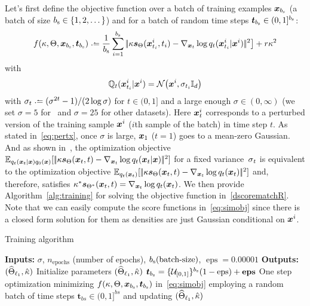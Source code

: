 Let's first define the objective function over a batch  of training examples $\x_{\batchS}$ (a batch of size $\batchS\in \{1,2,\dots\}$) and for a batch of random time steps $\boldsymbol{t}_{\batchS}\in (0,1]^{\batchS}$: 
\begin{equation}\label{eq:simobj}
f(\scale,\Theta,\x_{\batchS},\boldsymbol{t}_{\batchS})\deq \frac{1}{\batchS}\sum_{i=1}^{\batchS}\norm{\scale\scoref(\x^i_{t_i},t_i)-\nabla_{\x_{t}}\log \Fdd_t(\x^i_{t_i}|\x^i)}^2\bigr]
 +\tuning \scale^2 
\end{equation}
with 
\begin{equation}\label{eq:pertx}   \Fd_t(\x^i_{t_i}|\x^i)=\mathcal{N}\bigl(\x^i,\sigma_{t_i}\Identity\bigr) 
\end{equation}
with $\sigma_t\deq (\sigma^{2t}-1)/(2\log \sigma)$ for $t\in (0,1]$ and a large enough $\sigma\in (0,\infty)$ (we set $\sigma=5$ for \ButF~and $\sigma=25$ for other datasets). 
Here $\x^i_t$ corresponds to a perturbed version of the training sample $\x^i$ ($i$th sample of the batch) in  time step $t$. As stated in~\eqref{eq:pertx}, once $\sigma$ is large, $\x_{1}$ ($t=1$) goes to a mean-zero Gaussian. 
And as shown in~\citet{vincent2011connection}, the optimization objective  $\E_{\Fdd_t(\x_t|\x)\Fdd_{0}(\x)}[\norm{\scale\scoref(\x_{t},t)-\nabla_{\x_{t}}\log \Fdd_t(\x_{t}|\x)}^2]$ for a fixed variance~$\varnoise_t$ is equivalent to the optimization  objective $\E_{\Fdd_t(\x_t)}[\norm{\scale\scoref(\x_{t},t)-\nabla_{\x_{t}}\log \Fdd_t(\x_{t})}^2]$ and, therefore, satisfies $\scale^*\scorefS(\x_{t},t)=\nabla_{\x_t}\log \Fdd_t(\x_t)$.
We then provide Algorithm~\ref{alg:training} for solving the objective function in~\eqref{dscorematchR}. 
Note that we can easily compute the score functions in~\eqref{eq:simobj} since there is a  closed form solution for them as densities are just Gaussian conditional on $\x^i$. 
\begin{algorithm}[H]
\caption{Training algorithm}\label{alg:training}
\begin{algorithmic}[1] %
\STATE \textbf{Inputs:} $\sigma$, $n_{\operatorname{epochs}}$ (number of epochs), $\batchS(\operatorname{batch-size})$, $\operatorname{eps}=0.00001$
\STATE \textbf{Outputs:} $(\DnSMR,\scaleM)$
\STATE Initialize parameters $(\DnSMR,\scaleM)$ 
\STATE $\boldsymbol{t}_{\batchS}=\{\mathcal{U}_{[0,1]}\}^{\batchS}  (1 - \operatorname{eps}) + \boldsymbol{\operatorname{eps}}$ 
    \STATE One step optimization minimizing   $f(\scale,\Theta,\x_{\batchS},\boldsymbol{t}_{\batchS})$ in~\eqref{eq:simobj} employing a random batch of time steps $\boldsymbol{t}_{bs}\in (0,1]^{bs}$  and updating $(\DnSMR,\scaleM)$
\ENDFOR
\ENDFOR


\end{algorithmic}
\end{algorithm}
